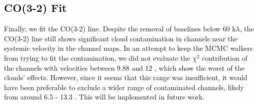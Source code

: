 



\subsection{CO(3-2) Fit}
\label{subsection:co_fit}
Finally, we fit the CO(3-2) line. Despite the removal of baselines below 60 k$\lambda$, the CO(3-2) line still shows significant cloud contamination in channels near the systemic velocity in the channel maps. In an attempt to keep the MCMC walkers from trying to fit the contamination, we did not evaluate the $\chi^2$ contribution of the channels with velocities between 9.88 and 12 \kms, which show the worst of the clouds' effects. However, since it seems that this range was insufficient, it would have been preferable to exclude a wider range of contaminated channels, likely from around 6.5 - 13.3 \kms. This will be implemented in future work.



